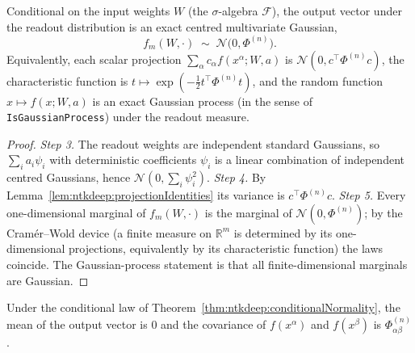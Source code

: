 \begin{theorem}\label{thm:ntkdeep:conditionalNormality}
  \leanok
Conditional on the input weights $W$ (the $\sigma$-algebra $\mathcal F$), the output vector under the readout distribution is an exact centred multivariate Gaussian,
\[
  f_m(W,\cdot)\;\sim\;\mathcal N\bigl(0,\Phi^{(n)}\bigr).
\]
Equivalently, each scalar projection $\sum_\alpha c_\alpha f(x^\alpha;W,a)$ is $\mathcal N(0,c^\top\Phi^{(n)}c)$, the characteristic function is $t\mapsto\exp(-\tfrac12t^\top\Phi^{(n)}t)$, and the random function $x\mapsto f(x;W,a)$ is an exact Gaussian process (in the sense of \texttt{IsGaussianProcess}) under the readout measure.
\end{theorem}

\begin{proof}
  \leanok
\emph{Step 3.} The readout weights are independent standard Gaussians, so $\sum_ia_i\psi_i$ with deterministic coefficients $\psi_i$ is a linear combination of independent centred Gaussians, hence $\mathcal N(0,\sum_i\psi_i^2)$. \emph{Step 4.} By Lemma~\ref{lem:ntkdeep:projectionIdentities} its variance is $c^\top\Phi^{(n)}c$.
\emph{Step 5.} Every one-dimensional marginal of $f_m(W,\cdot)$ is the marginal of $\mathcal N(0,\Phi^{(n)})$; by the Cram\'er--Wold device (a finite measure on $\mathbb R^m$ is determined by its one-dimensional projections, equivalently by its characteristic function) the laws coincide. The Gaussian-process statement is that all finite-dimensional marginals are Gaussian.
\end{proof}

\begin{lemma}\label{lem:ntkdeep:conditionalMoments}
  \leanok
Under the conditional law of Theorem~\ref{thm:ntkdeep:conditionalNormality}, the mean of the output vector is $0$ and the covariance of $f(x^\alpha)$ and $f(x^\beta)$ is $\Phi^{(n)}_{\alpha\beta}$.
\end{lemma}


